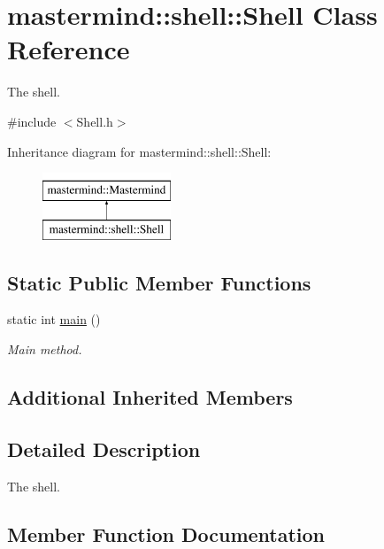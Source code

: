 \hypertarget{classmastermind_1_1shell_1_1_shell}{}\section{mastermind\+:\+:shell\+:\+:Shell Class Reference}
\label{classmastermind_1_1shell_1_1_shell}


The shell.  




{\ttfamily \#include $<$Shell.\+h$>$}

Inheritance diagram for mastermind\+:\+:shell\+:\+:Shell\+:\begin{figure}[H]
\begin{center}
\leavevmode
\includegraphics[height=2.000000cm]{classmastermind_1_1shell_1_1_shell}
\end{center}
\end{figure}
\subsection*{Static Public Member Functions}
\begin{DoxyCompactItemize}
\item 
static int \hyperlink{classmastermind_1_1shell_1_1_shell_aa47488e9975693b33445e871951ec9cd}{main} ()
\begin{DoxyCompactList}\small\item\em Main method. \end{DoxyCompactList}\end{DoxyCompactItemize}
\subsection*{Additional Inherited Members}


\subsection{Detailed Description}
The shell. 

\subsection{Member Function Documentation}
\hypertarget{classmastermind_1_1shell_1_1_shell_aa47488e9975693b33445e871951ec9cd}{}\label{classmastermind_1_1shell_1_1_shell_aa47488e9975693b33445e871951ec9cd} 
